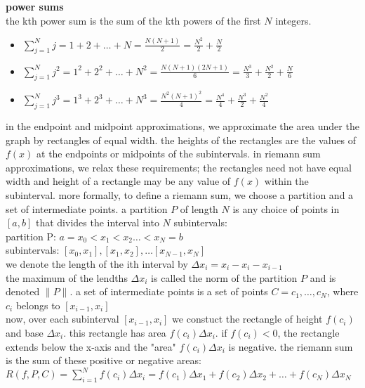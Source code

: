 \documentclass{article}
\begin{document}
\textbf{power sums}\\
the kth power sum is the sum of the kth powers of the first $N$ integers.\\
	\begin{itemize}
		\item $\sum_{j=1}^{N}j = 1 + 2 + \ldots + N = \frac{N(N + 1)}{2} = \frac{N^2}{2} + \frac{N}{2}$
		\item $\sum_{j=1}^{N}j^2 = 1^2 + 2^2 + \ldots + N^2 = \frac{N(N + 1)(2N + 1)}{6} = \frac{N^3}{3} + \frac{N^2}{2} + \frac{N}{6}$ 
		\item $\sum_{j=1}^{N}j^3 = 1^3 + 2^3 + \ldots + N^3 = \frac{N^2(N + 1)^2}{4} = \frac{N^4}{4} + \frac{N^3}{2} + \frac{N^2}{4}$ 
	\end{itemize}

in the endpoint and midpoint approximations, we approximate the area under the graph by rectangles of equal width. the heights of the rectangles are the values of $f(x)$ at the endpoints or midpoints of the subintervals. in riemann sum approximations, we relax these requirements; the rectangles need not have equal width and height of a rectangle may be any value of $f(x)$ within the subinterval. more formally, to define a riemann sum, we choose a partition and a set of intermediate points. a partition $P$ of length $N$ is any choice of points in $[a, b]$ that divides the interval into $N$ subintervals:\\
partition P: $a = x_0 < x_1 < x_2 \ldots < x_N = b$\\
subintervals: $[x_0, x_1], [x_1, x_2], \ldots [x_{N-1}, x_{N}]$\\
we denote the length of the ith interval by $\Delta x_i = x_i - x_i - x_{i-1}$\\
the maximum of the lendths $\Delta x_i$ is called the norm of the partition $P$ and is denoted $\lVert P\rVert$. a set of intermediate points is a set of points $C = {c_1, \ldots, c_N}$, where $c_i$ belongs to $[x_{i-1}, x_i]$\\

now, over each subinterval $[x_{i-1}, x_i]$ we constuct the rectangle of height $f(c_i)$ and base $\Delta x_i$. this rectangle has area $f(c_i)\Delta x_i$. if $f(c_i) < 0$, the rectangle extends below the x-axis and the "area" $f(c_i)\Delta x_i$ is negative. the riemann sum is the sum of these positive or negative areas: $R(f, P, C) = \sum_{i=1}^{N}f(c_i)\Delta x_i = f(c_1)\Delta x_1 + f(c_2)\Delta x_2 + \ldots + f(c_N)\Delta x_N$\\
\end{document}
